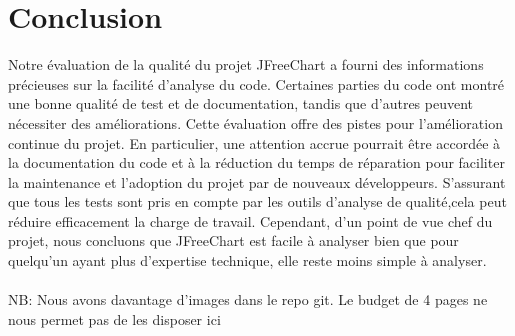 \documentclass{proc}
\begin{document}
\section{Conclusion}
Notre évaluation de la qualité du projet JFreeChart a fourni des informations précieuses sur la facilité d'analyse du code. Certaines parties du code ont montré une bonne qualité de test et de documentation, tandis que d'autres peuvent nécessiter des améliorations. Cette évaluation offre des pistes pour l'amélioration continue du projet. En particulier, une attention accrue pourrait être accordée à la documentation du code et à la réduction du temps de réparation pour faciliter la maintenance et l'adoption du projet par de nouveaux développeurs. S'assurant que tous les tests sont pris en compte par les outils d'analyse de qualité,cela peut réduire efficacement la charge de travail. Cependant, d'un point de vue chef du projet, nous concluons que JFreeChart est facile à analyser bien que pour quelqu'un ayant plus d'expertise technique, elle reste moins simple à analyser.
\\\\
{NB: Nous avons davantage d'images dans le repo git. Le budget de 4 pages ne nous permet pas de les disposer ici}


  
\end{document}
